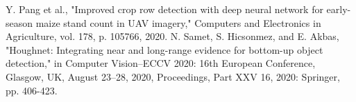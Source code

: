 \documentclass[conference]{IEEEtran}
\begin{document}
\begin{thebibliography}{00}
 Y. Pang et al., "Improved crop row detection with deep neural network for early-season maize stand count in UAV imagery," Computers and Electronics in Agriculture, vol. 178, p. 105766, 2020.
 N. Samet, S. Hicsonmez, and E. Akbas, "Houghnet: Integrating near and long-range evidence for bottom-up object detection," in Computer Vision–ECCV 2020: 16th European Conference, Glasgow, UK, August 23–28, 2020, Proceedings, Part XXV 16, 2020: Springer, pp. 406-423.
\end{thebibliography}

\vspace{12pt}
\end{document}
